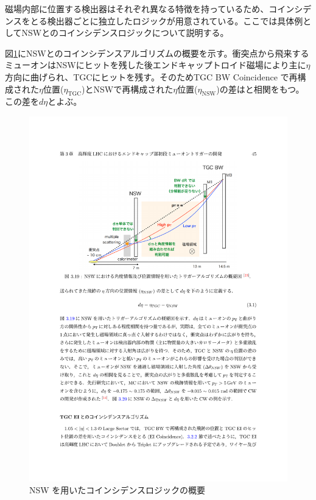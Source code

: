 磁場内部に位置する検出器はそれぞれ異なる特徴を持っているため、コインシデンスをとる検出器ごとに独立したロジックが用意されている。ここでは具体例としてNSWとのコインシデンスロジックについて説明する。

図\ref{Concept_NSW}にNSWとのコインシデンスアルゴリズムの概要を示す。衝突点から飛来するミューオンはNSWにヒットを残した後エンドキャップトロイド磁場により主に$\eta$方向に曲げられ、TGCにヒットを残す。そのためTGC BW Coincidence で再構成された$\eta$位置($\eta_{\mathrm{TGC}}$)とNSWで再構成された$\eta$位置($\eta_{\mathrm{NSW}}$)の差は\pt と相関をもつ。この差を$d\eta$とよぶ。

\begin{figure} 
\centering
\includegraphics[width=16cm]{fig/SL/Concept_NSW.pdf}
\caption[NSW を用いたコインシデンスロジックの概要]{NSW を用いたコインシデンスロジックの概要\cite{mt_akatsuka}}
\label{Concept_NSW}
\end{figure}

